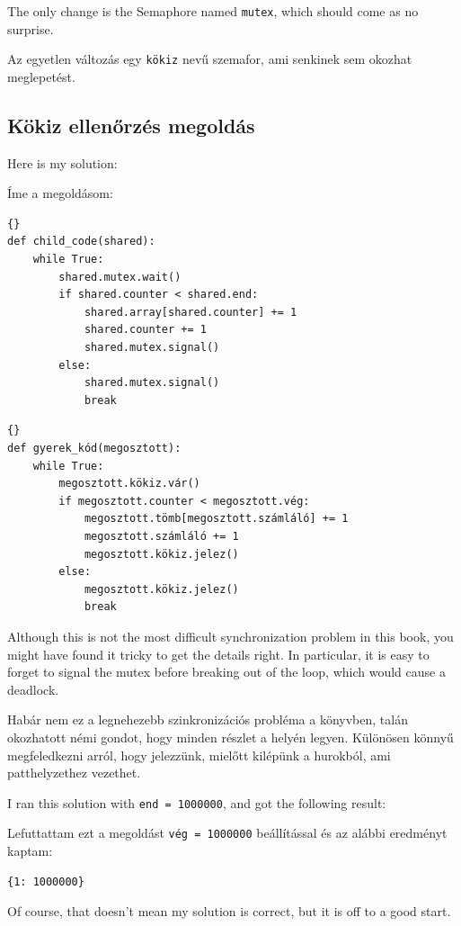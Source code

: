 \documentclass{book}
\newcommand{\clearemptydoublepage}{\newpage\cleardoublepage}
\begin{document}
The only change is the Semaphore named {\tt mutex}, which should
come as no surprise.

Az egyetlen változás egy {\tt kökiz} nevű szemafor, ami senkinek
sem okozhat meglepetést.

\clearemptydoublepage
\subsection{Kökiz ellenőrzés megoldás}

Here is my solution:

Íme a megoldásom:

\begin{lstlisting}[title={}]{}
def child_code(shared):
    while True:
        shared.mutex.wait()
        if shared.counter < shared.end:
            shared.array[shared.counter] += 1
            shared.counter += 1
            shared.mutex.signal()
        else:
            shared.mutex.signal()
            break
\end{lstlisting}

\begin{lstlisting}[title={Kökiz ellenőrzés megoldás}]{}
def gyerek_kód(megosztott):
    while True:
        megosztott.kökiz.vár()
        if megosztott.counter < megosztott.vég:
            megosztott.tömb[megosztott.számláló] += 1
            megosztott.számláló += 1
            megosztott.kökiz.jelez()
        else:
            megosztott.kökiz.jelez()
            break
\end{lstlisting}

Although this is not the most difficult synchronization problem
in this book, you might have found it tricky to get the details
right.  In particular, it is easy to forget to signal the mutex
before breaking out of the loop, which would cause a deadlock.

Habár nem ez a legnehezebb szinkronizációs probléma a könyvben,
talán okozhatott némi gondot, hogy minden részlet a helyén legyen.
Különösen könnyű megfeledkezni arról, hogy jelezzünk, mielőtt
kilépünk a hurokból, ami patthelyzethez vezethet.

I ran this solution with {\tt end = 1000000}, and got the
following result:

Lefuttattam ezt a megoldást {\tt vég = 1000000} beállítással
és az alábbi eredményt kaptam:
\begin{verbatim}
{1: 1000000}
\end{verbatim}

Of course, that doesn't mean my solution is correct, but it is
off to a good start.
\end{document}
